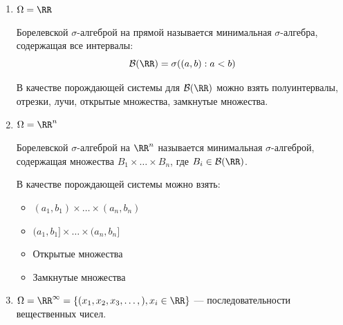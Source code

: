 \begin{example}{}{}
    \begin{enumerate}
        \item
            \( \Omega = \RR \)

            \begin{defn}{}{}
                Борелевской \( \sigma \)-алгеброй
                на прямой называется минимальная \( \sigma \)-алгебра,
                содержащая все интервалы:
                \[
                    \mathcal{B}(\RR) = \sigma( (a, b) : a < b )
                \]
            \end{defn}

            \begin{exercise}{}{}
                В качестве порождающей системы
                для \( \mathcal{B}(\RR) \)
                можно взять полуинтервалы, отрезки, лучи, открытые множества, замкнутые множества.
            \end{exercise}
        \item
            \( \Omega = \RR^n \)

            \begin{defn}{}{}
                Борелевской \( \sigma \)-алгеброй на \( \RR^n \)
                называется минимальная \( \sigma \)-алгеброй,
                содержащая множества \( B_1 \times \ldots \times B_n \),
                где \( B_i \in \mathcal{B}(\RR) \).
            \end{defn}

            \begin{exercise}{}{}
                В качестве порождающей системы можно взять:
                \begin{itemize}
                    \item
                        \( (a_1, b_1) \times \ldots \times (a_n, b_n) \)
                    \item
                        \( (a_1, b_1] \times \ldots \times (a_n, b_n] \)
                    \item
                        Открытые множества
                    \item
                        Замкнутые множества
                \end{itemize}
            \end{exercise}
        \item
            \( \Omega = \RR^{\infty} = \{ (x_1, x_2, x_3, \ldots, ), x_i \in \RR \} \) --- последовательности вещественных чисел.


\end{enumerate}
\end{example}
